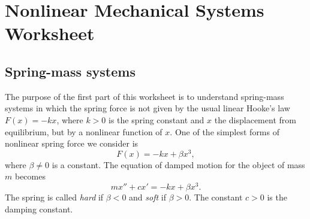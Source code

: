 \documentclass[11pt]{article}
\author{Nikolas Eptaminitakis}
\renewcommand{\b}{\beta}
\begin{document}
\section*{Nonlinear Mechanical Systems Worksheet}

\subsection*{Spring-mass systems}

The purpose of the first part of this worksheet is to understand spring-mass systems in which the spring force is not given by the usual linear Hooke's law $F(x)=-kx$, where $k>0$ is the spring constant and $x$ the displacement from equilibrium, but by a nonlinear function of $x$.
One of the simplest forms of nonlinear spring force we consider is
\begin{equation}
	F(x)=-kx+\b x^3,
\end{equation}
where $\b\neq 0 $ is a constant.
The equation of damped motion for the object of mass $m$ becomes 
\begin{equation}
	mx''+cx'=-kx+\b x^3.\label{eq:motion}
\end{equation}
The spring is called \textit{hard} if $\b<0$ and \textit{soft} if $\b>0$. The constant $c>0$ is the damping constant.
\end{document}
